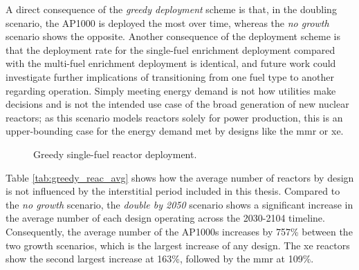 A direct consequence of the \textit{greedy deployment} scheme is that, in the doubling scenario, the AP1000 is deployed the most over time, whereas the \textit{no growth} scenario shows the opposite. Another consequence of the deployment scheme is that the deployment rate for the single-fuel enrichment deployment compared with the multi-fuel enrichment deployment is identical, and future work could investigate further implications of transitioning from one fuel type to another regarding operation. Simply meeting energy demand is not how utilities make decisions and is not the intended use case of the broad generation of new nuclear reactors; as this scenario models reactors solely for power production, this is an upper-bounding case for the energy demand met by designs like the \gls{mmr} or \gls{xe}.


\begin{figure}[H]
  \hfill
  \caption{Greedy single-fuel reactor deployment.}
  \label{fig:greedy_of_reactors}
\end{figure}

Table \ref{tab:greedy_reac_avg} shows how the average number of reactors by design is not influenced by the interstitial period included in this thesis. Compared to the \textit{no growth} scenario, the \textit{double by 2050} scenario shows a significant increase in the average number of each design operating across the 2030-2104 timeline. Consequently, the average number of the AP1000s increases by 757\% between the two growth scenarios, which is the largest increase of any design. The \gls{xe} reactors show the second largest increase at 163\%, followed by the \gls{mmr} at 109\%.

